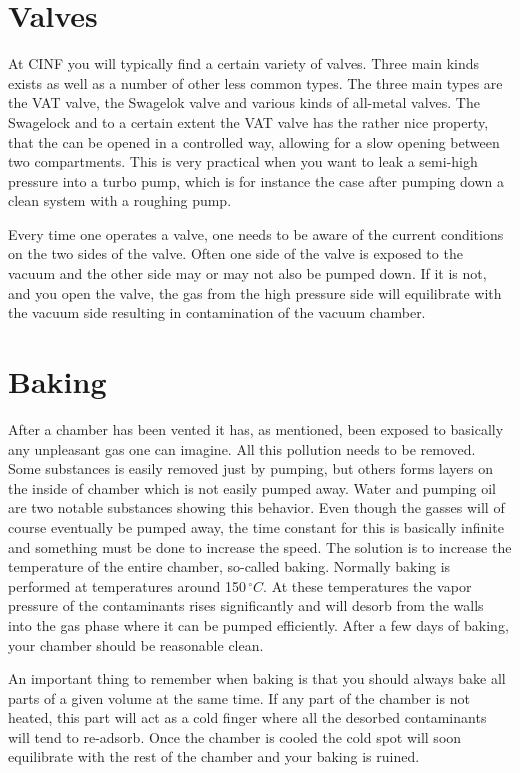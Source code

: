 \documentclass[a4paper,english]{article}
\begin{document}
\section{Valves}
At CINF you will typically find a certain variety of valves. Three main kinds exists as well as a number of other less common types. The three main types are the VAT valve, the Swagelok valve and various kinds of all-metal valves. The Swagelock and to a certain extent the VAT valve has the rather nice property, that the can be opened in a controlled way, allowing for a slow opening between two compartments. This is very practical when you want to leak a semi-high pressure into a turbo pump, which is for instance the case after pumping down a clean system with a roughing pump.

Every time one operates a valve, one needs to be aware of the current conditions on the two sides of the valve. Often one side of the valve is exposed to the vacuum and the other side may or may not also be pumped down. If it is not, and you open the valve, the gas from the high pressure side will equilibrate with the vacuum side resulting in contamination of the vacuum chamber.

\section{Baking}
After a chamber has been vented it has, as mentioned, been exposed to basically any unpleasant gas one can imagine. All this pollution needs to be removed. Some substances is easily removed just by pumping, but others forms layers on the inside of chamber which is not easily pumped away. Water and pumping oil are two notable substances showing this behavior. Even though the gasses will of course eventually be pumped away, the time constant for this is basically infinite and something must be done to increase the speed. The solution is to increase the temperature of the entire chamber, so-called baking. Normally baking is performed at temperatures around 150\,$^{\circ}C$. At these temperatures the vapor pressure of the contaminants rises significantly and will desorb from the walls into the gas phase where it can be pumped efficiently. After a few days of baking, your chamber should be reasonable clean.

An important thing to remember when baking is that you should always bake all parts of a given volume at the same time. If any part of the chamber is not heated, this part will act as a cold finger where all the desorbed contaminants will tend to re-adsorb. Once the chamber is cooled the cold spot will soon equilibrate with the rest of the chamber and your baking is ruined.

%
%

\end{document}
